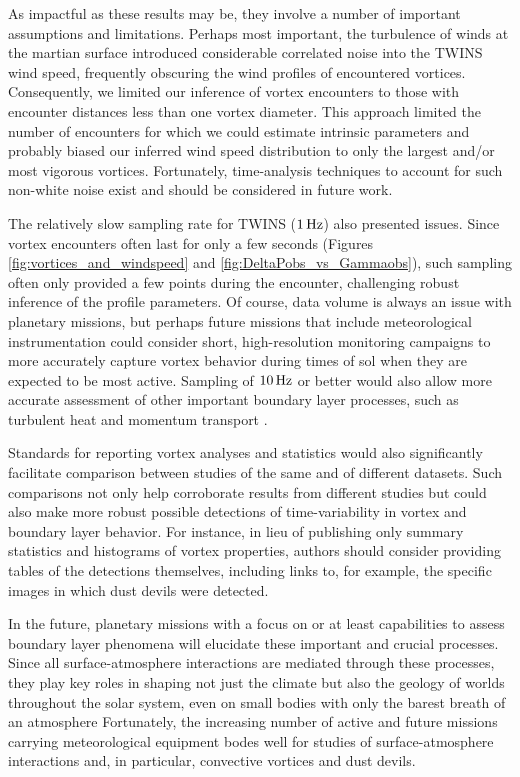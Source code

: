 \documentclass[linenumbers,trackchanges]{aastex63}
\begin{document}
As impactful as these results may be, they involve a number of important assumptions and limitations. Perhaps most important, the turbulence of winds at the martian surface introduced considerable correlated noise \citep[cf.][]{2018RemS...10...65J} into the TWINS wind speed, frequently obscuring the wind profiles of encountered vortices. Consequently, we limited our inference of vortex encounters to those with encounter distances less than one vortex diameter. This approach limited the number of encounters for which we could estimate intrinsic parameters and probably biased our inferred wind speed distribution to only the largest and/or most vigorous vortices. Fortunately, time-analysis techniques to account for such non-white noise exist \citep{hodlr} and should be considered in future work. 

The relatively slow sampling rate for TWINS ($1\,{\rm Hz}$) also presented issues. Since vortex encounters often last for only a few seconds (Figures \ref{fig:vortices_and_windspeed} and \ref{fig:DeltaPobs_vs_Gammaobs}), such sampling often only provided a few points during the encounter, challenging robust inference of the profile parameters. Of course, data volume is always an issue with planetary missions, but perhaps future missions that include meteorological instrumentation could consider short, high-resolution monitoring campaigns to more accurately capture vortex behavior during times of sol when they are expected to be most active. Sampling of $10\,{\rm Hz}$ or better would also allow more accurate assessment of other important boundary layer processes, such as turbulent heat and momentum transport \citep{2011RvGeo..49.3005P}.

Standards for reporting vortex analyses and statistics would also significantly facilitate comparison between studies of the same and of different datasets. Such comparisons not only help corroborate results from different studies but could also make more robust possible detections of time-variability in vortex and boundary layer behavior. For instance, in lieu of publishing only summary statistics and histograms of vortex properties, authors should consider providing tables of the detections themselves, including links to, for example, the specific images in which dust devils were detected.

In the future, planetary missions with a focus on or at least capabilities to assess boundary layer phenomena will elucidate these important and crucial processes. Since all surface-atmosphere interactions are mediated through these processes, they play key roles in shaping not just the climate but also the geology of worlds throughout the solar system, even on small bodies with only the barest breath of an atmosphere \citep{2017PNAS..114.2509J} Fortunately, the increasing number of active and future missions carrying meteorological equipment bodes well for studies of surface-atmosphere interactions and, in particular, convective vortices and dust devils. 
\end{document}
